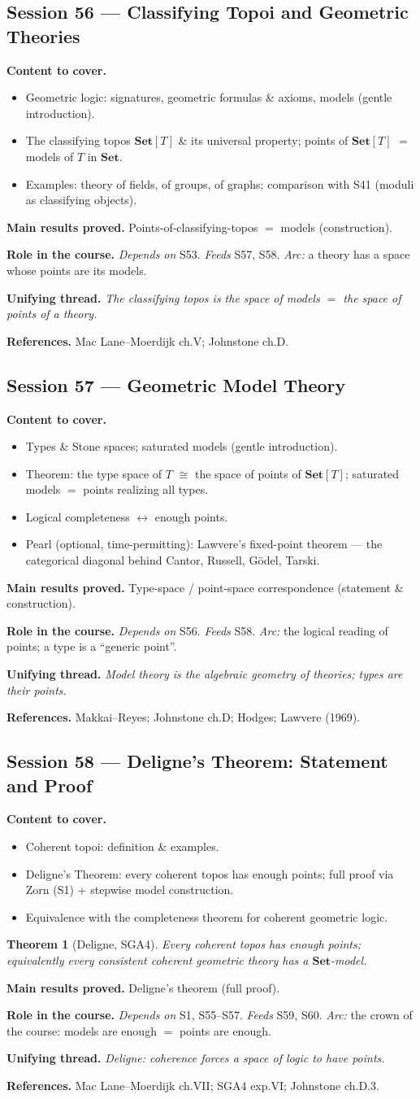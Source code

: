 \documentclass[11pt,a4paper]{article}
\newtheorem*{theorem*}{Theorem}
\newcommand{\sess}[2]{\subsection[#1. #2]{Session #1 --- #2}}
\newcommand{\chead}{\par\smallskip\noindent\textbf{Content to cover.}}
\newcommand{\proved}[1]{\par\smallskip\noindent\textbf{Main results proved.} #1}
\newcommand{\role}[1]{\par\smallskip\noindent\textbf{Role in the course.} #1}
\newcommand{\thread}[1]{\par\smallskip\noindent\textbf{Unifying thread.} \textit{#1}}
\newcommand{\srefs}[1]{\par\smallskip\noindent\textbf{References.} #1}
\begin{document}
	\sess{56}{Classifying Topoi and Geometric Theories}
	\chead
	\begin{itemize}
		\item Geometric logic: signatures, geometric formulas \& axioms, models (gentle introduction).
		\item The classifying topos $\mathbf{Set}[T]$ \& its universal property; points of $\mathbf{Set}[T]$ $=$ models of $T$ in $\mathbf{Set}$.
		\item Examples: theory of fields, of groups, of graphs; comparison with S41 (moduli as classifying objects).
	\end{itemize}
	\proved{Points-of-classifying-topos $=$ models (construction).}
	\role{\emph{Depends on} S53. \emph{Feeds} S57, S58. \emph{Arc:} a theory has a space whose points are its models.}
	\thread{The classifying topos is the space of models $=$ the space of points of a theory.}
	\srefs{Mac Lane--Moerdijk ch.V; Johnstone ch.D.}
	
	\sess{57}{Geometric Model Theory}
	\chead
	\begin{itemize}
		\item Types \& Stone spaces; saturated models (gentle introduction).
		\item Theorem: the type space of $T$ $\cong$ the space of points of $\mathbf{Set}[T]$; saturated models $=$ points realizing all types.
		\item Logical completeness $\leftrightarrow$ enough points.
		\item Pearl (optional, time-permitting): Lawvere's fixed-point theorem --- the categorical diagonal behind Cantor, Russell, G\"odel, Tarski.
	\end{itemize}
	\proved{Type-space / point-space correspondence (statement \& construction).}
	\role{\emph{Depends on} S56. \emph{Feeds} S58. \emph{Arc:} the logical reading of points; a type is a ``generic point''.}
	\thread{Model theory is the algebraic geometry of theories; types are their points.}
	\srefs{Makkai--Reyes; Johnstone ch.D; Hodges; Lawvere (1969).}
	
	\sess{58}{Deligne's Theorem: Statement and Proof}
	\chead
	\begin{itemize}
		\item Coherent topoi: definition \& examples.
		\item Deligne's Theorem: every coherent topos has enough points; full proof via Zorn (S1) + stepwise model construction.
		\item Equivalence with the completeness theorem for coherent geometric logic.
	\end{itemize}
	\begin{theorem*}[Deligne, SGA4] Every coherent topos has enough points; equivalently every consistent coherent geometric theory has a $\mathbf{Set}$-model.
	\end{theorem*}
	\proved{Deligne's theorem (full proof).}
	\role{\emph{Depends on} S1, S55--S57. \emph{Feeds} S59, S60. \emph{Arc:} the crown of the course: models are enough $=$ points are enough.}
	\thread{Deligne: coherence forces a space of logic to have points.}
	\srefs{Mac Lane--Moerdijk ch.VII; SGA4 exp.VI; Johnstone ch.D.3.}
	
\end{document}
